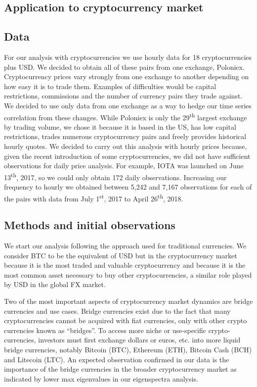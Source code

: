 \documentclass[a4paper]{article}
\begin{document}
\begin{multicols}{2}
\section{Application to cryptocurrency market}\label{crypto}

\subsection{Data}
For our analysis with cryptocurrencies we use hourly data\cite{cryptodownload} for 18 cryptocurrencies plus USD. We decided to obtain all of these pairs from one exchange, Poloniex\cite{poloniex}. Cryptocurrency prices vary strongly from one exchange to another depending on how easy it is to trade them. Examples of difficulties would be capital restrictions, commissions and the number of currency pairs they trade against. We decided to use only data from one exchange as a way to hedge our time series correlation from these changes. While Poloniex is only the 29\textsuperscript{th} largest exchange by trading volume\cite{coinmarketcap}, we chose it because it is based in the US, has low capital restrictions, trades numerous cryptocurrency pairs and freely provides historical hourly quotes.
We decided to carry out this analysis with hourly prices because, given the recent introduction of some cryptocurrencies, we did not have sufficient observations for daily price analysis. For example, IOTA was launched on June 13\textsuperscript{th}, 2017, so we could only obtain 172 daily observations. Increasing our frequency to hourly we obtained between 5,242 and 7,167 observations for each of the pairs with data from July 1\textsuperscript{st}, 2017 to April 26\textsuperscript{th}, 2018.

\subsection{Methods and initial observations}
We start our analysis following the approach used for traditional currencies. We consider BTC to be the equivalent of USD but in the cryptocurrency market because it is the most traded and valuable cryptocurrency and because it is the most common asset necessary to buy other cryptocurrencies, a similar role played by USD in the global FX market.

Two of the most important aspects of cryptocurrency market dynamics are bridge currencies and use cases. Bridge currencies exist due to the fact that many cryptocurrencies cannot be acquired with fiat currencies, only with other crypto currencies known as “bridges”. To access more niche or use-specific crypto-currencies, investors must first exchange dollars or euros, etc. into more liquid bridge currencies, notably Bitcoin (BTC), Ethereum (ETH), Bitcoin Cash (BCH) and Litecoin (LTC). An expected observation confirmed in our data is the importance of the bridge currencies in the broader cryptocurrency market as indicated by lower max eigenvalues in our eigenspectra analysis.


\end{multicols}
\end{document}
